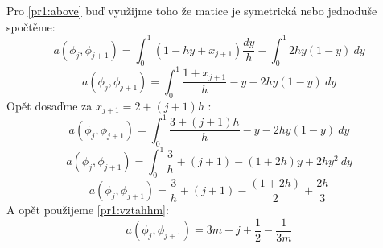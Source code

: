 \documentclass[../main.tex]{subfiles}
\begin{document}
Pro \eqref{pr1:above} buď využijme toho že matice je symetrická nebo jednoduše spočtěme:
\begin{equation}
    a(\phi_j, \phi_{j+1}) = \int_0^1 (1 -hy + x_{j+1}) \frac{dy}{h} - \int_0^1 2h y(1-y) \ dy
\end{equation}
\begin{equation}
    a(\phi_j, \phi_{j+1}) = \int_0^1 \frac{1 + x_{j+1}}{h} -y - 2h y(1-y) \ dy
\end{equation}
Opět dosaďme za $x_{j+1} = 2 + (j+1)h$ : 
\begin{equation}
    a(\phi_j, \phi_{j+1}) = \int_0^1 \frac{3 + (j+1)h}{h} -y - 2h y(1-y) \ dy
\end{equation}
\begin{equation}
    a(\phi_j, \phi_{j+1}) = \int_0^1 \frac{3}{h} + (j+1) -(1+2h)y + 2hy^2 \ dy
\end{equation}
\begin{equation}
    a(\phi_j, \phi_{j+1}) =  \frac{3}{h} + (j+1) -\frac{(1+2h)}{2} + \frac{2h}{3}
\end{equation}
A opět použijeme \eqref{pr1:vztahhm}:
\begin{equation}
    a(\phi_j, \phi_{j+1}) =  3m + j+ \frac{1}{2} - \frac{1}{3m}
\end{equation}
\end{document}
